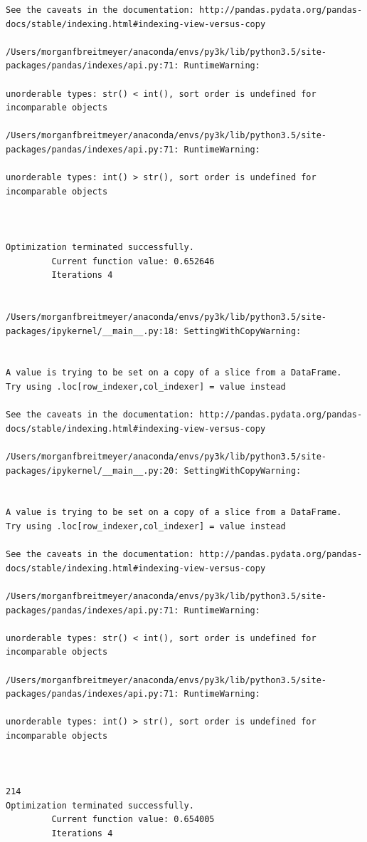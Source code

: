 \begin{lstlisting}
See the caveats in the documentation: http://pandas.pydata.org/pandas-docs/stable/indexing.html#indexing-view-versus-copy

/Users/morganfbreitmeyer/anaconda/envs/py3k/lib/python3.5/site-packages/pandas/indexes/api.py:71: RuntimeWarning:

unorderable types: str() < int(), sort order is undefined for incomparable objects

/Users/morganfbreitmeyer/anaconda/envs/py3k/lib/python3.5/site-packages/pandas/indexes/api.py:71: RuntimeWarning:

unorderable types: int() > str(), sort order is undefined for incomparable objects



Optimization terminated successfully.
         Current function value: 0.652646
         Iterations 4


/Users/morganfbreitmeyer/anaconda/envs/py3k/lib/python3.5/site-packages/ipykernel/__main__.py:18: SettingWithCopyWarning:


A value is trying to be set on a copy of a slice from a DataFrame.
Try using .loc[row_indexer,col_indexer] = value instead

See the caveats in the documentation: http://pandas.pydata.org/pandas-docs/stable/indexing.html#indexing-view-versus-copy

/Users/morganfbreitmeyer/anaconda/envs/py3k/lib/python3.5/site-packages/ipykernel/__main__.py:20: SettingWithCopyWarning:


A value is trying to be set on a copy of a slice from a DataFrame.
Try using .loc[row_indexer,col_indexer] = value instead

See the caveats in the documentation: http://pandas.pydata.org/pandas-docs/stable/indexing.html#indexing-view-versus-copy

/Users/morganfbreitmeyer/anaconda/envs/py3k/lib/python3.5/site-packages/pandas/indexes/api.py:71: RuntimeWarning:

unorderable types: str() < int(), sort order is undefined for incomparable objects

/Users/morganfbreitmeyer/anaconda/envs/py3k/lib/python3.5/site-packages/pandas/indexes/api.py:71: RuntimeWarning:

unorderable types: int() > str(), sort order is undefined for incomparable objects



214
Optimization terminated successfully.
         Current function value: 0.654005
         Iterations 4



\end{lstlisting}
